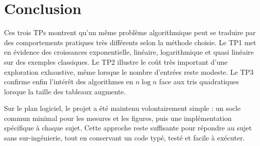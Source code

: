 \section{Conclusion}\label{sec:conclusion}

Ces trois TPs montrent qu'un m\^{e}me probl\`{e}me algorithmique peut se traduire
par des comportements pratiques tr\`{e}s diff\'{e}rents selon la m\'{e}thode choisie.
Le TP1 met en \'{e}vidence des croissances exponentielle, lin\'{e}aire,
logarithmique et quasi lin\'{e}aire sur des exemples classiques.
Le TP2 illustre
le co\^{u}t tr\`{e}s important d'une exploration exhaustive, m\^{e}me lorsque le
nombre d'entr\'{e}es reste modeste.
Le TP3 confirme enfin l'int\'{e}r\^{e}t des
algorithmes en \(n \log n\) face aux tris quadratiques lorsque la taille des
tableaux augmente.

Sur le plan logiciel, le projet a \'{e}t\'{e} maintenu volontairement simple : un
socle commun minimal pour les mesures et les figures, puis une impl\'{e}mentation
sp\'{e}cifique \`{a} chaque sujet.
Cette approche reste suffisante pour r\'{e}pondre au sujet
sans sur-ing\'{e}nierie, tout en conservant un code typ\'{e}, test\'{e} et facile
\`{a} ex\'{e}cuter.
